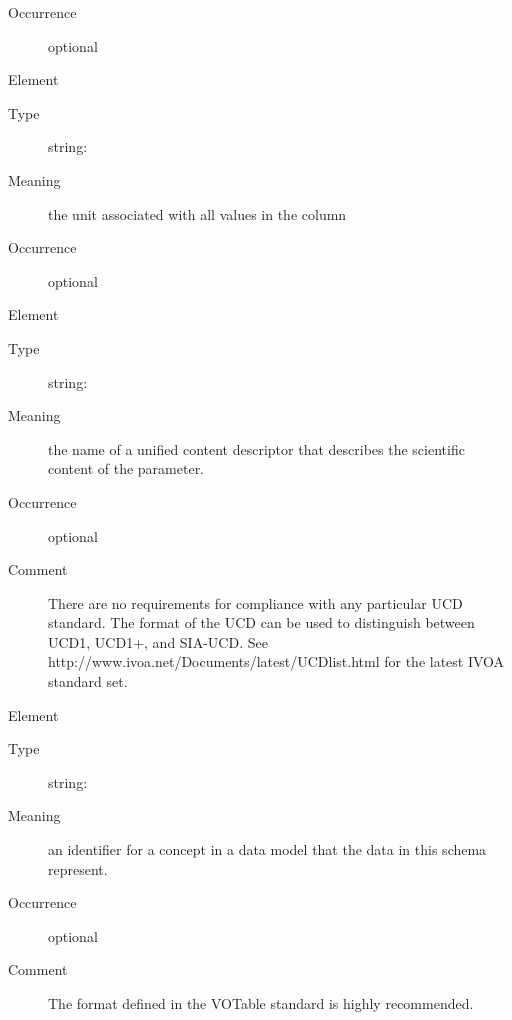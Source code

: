 \documentclass[11pt,a4paper]{ivoa}
\begin{document}
\begin{generated}
\begin{bigdescription}
\begin{description}
\item[Occurrence] optional

\end{description}
\item[Element \xmlel{unit}]
\begin{description}
\item[Type] string: 
\item[Meaning] 
                  the unit associated with all values in the column
               
\item[Occurrence] optional

\end{description}
\item[Element \xmlel{ucd}]
\begin{description}
\item[Type] string: 
\item[Meaning] 
                  the name of a unified content descriptor that
                  describes the scientific content of the parameter.  
               
\item[Occurrence] optional
\item[Comment] 
                  There are no requirements for compliance with any 
                  particular UCD standard.  The format of the UCD can
                  be used to distinguish between UCD1, UCD1+, and
                  SIA-UCD.  See 
                  http://www.ivoa.net/Documents/latest/UCDlist.html
                  for the latest IVOA standard set.  
               

\end{description}
\item[Element \xmlel{utype}]
\begin{description}
\item[Type] string: 
\item[Meaning] 
                  an identifier for a concept in a data model that
                  the data in this schema represent.  
               
\item[Occurrence] optional
\item[Comment] 
                  The format defined in the VOTable standard is highly
                  recommended. 
               

\end{description}


\end{bigdescription}\endgroup

\endgroup
\end{generated}
\end{document}
